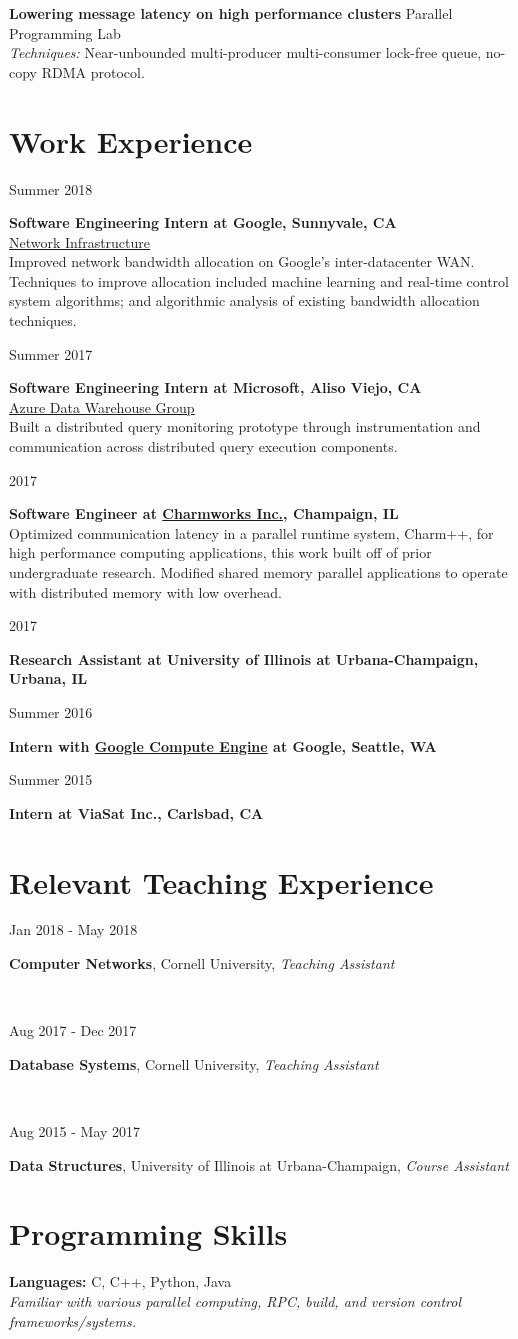 \documentclass[10pt]{article}
\newcommand{\leftrightrow}[2]{
	#1 \hfill #2 \\
}
\newcommand{\teachblock}[2]{
\begin{minipage}[t]{0.20\textwidth}
\vspace*{0.4em}
\begin{flushright}#2\end{flushright}
\end{minipage}
\hfill\vline\hfill
\begin{minipage}[t]{0.76\textwidth}
\vspace*{0.4em}
	#1
\end{minipage}
\vspace{0.2em}
}
\newcommand{\workblock}[4]{
\begin{minipage}[t]{0.14\textwidth}
\vspace*{0.4em}
\begin{flushright}#3\end{flushright}
\end{minipage}
\hfill\vline\hfill
\begin{minipage}[t]{0.82\textwidth}
\vspace*{0.4em}
	\textbf{#1} \\
	#2 \\
    #4
\end{minipage}
\vspace{0.7em}
}
\newcommand{\workblockempty}[2]{
\begin{minipage}[t]{0.14\textwidth}
\vspace*{0.4em}
\begin{flushright}#2\end{flushright}
\end{minipage}
\hfill\vline\hfill
\begin{minipage}[t]{0.82\textwidth}
\vspace*{0.4em}
	\textbf{#1}
\end{minipage}
\vspace{0.1em}
}
\newcommand{\workblocktwo}[3]{
\begin{minipage}[t]{0.14\textwidth}
\vspace*{0.4em}
\begin{flushright}#2\end{flushright}
\end{minipage}
\hfill\vline\hfill
\begin{minipage}[t]{0.82\textwidth}
\vspace*{0.4em}
	\textbf{#1} \\
    #3
\end{minipage}
\vspace{0.7em}
}
\newcommand{\researchblock}[3]{
	\leftrightrow{\textbf{#1}}{#2}#3
}
\begin{document}
\vspace{0.6em}

\researchblock{Lowering message latency on high performance clusters}{Parallel Programming Lab}
{
	\textit{Techniques: } Near-unbounded multi-producer multi-consumer lock-free queue, no-copy RDMA protocol.
}

\section{Work Experience}
\vspace{-0.4em}
\workblock{Software Engineering Intern at Google, Sunnyvale, CA}{\href{https://ai.google/research/pubs/pub43838}{Network Infrastructure}}{Summer 2018}{Improved network bandwidth allocation on Google's inter-datacenter WAN. Techniques to improve allocation included machine learning and real-time control system algorithms; and algorithmic analysis of existing bandwidth allocation techniques.}

\workblock{Software Engineering Intern at Microsoft, Aliso Viejo, CA}{\href{https://azure.microsoft.com/en-us/services/sql-data-warehouse/}{Azure Data Warehouse Group}}{Summer 2017}{Built a distributed query monitoring prototype through instrumentation and communication across distributed query execution components.}

\workblocktwo{Software Engineer at \href{http://www.charmplusplus.com/}{Charmworks Inc.}, Champaign, IL}{2017}{Optimized communication latency in a parallel runtime system, Charm++, for high performance computing applications, this work built off of prior undergraduate research. Modified shared memory parallel applications to operate with distributed memory with low overhead.
}

\workblockempty{Research Assistant at University of Illinois at Urbana-Champaign, Urbana, IL}{2017}

\workblockempty{Intern with \href{https://cloud.google.com/compute/}{Google Compute Engine} at Google, Seattle, WA}{Summer 2016}

\workblockempty{Intern at ViaSat Inc., Carlsbad, CA}{Summer 2015}

\vspace{-0.4em}

\section{Relevant Teaching Experience}
\vspace{-0.8em}
\teachblock{\textbf{Computer Networks}, Cornell University, \textit{Teaching Assistant}}{Jan 2018 - May 2018} \\
\teachblock{\textbf{Database Systems}, Cornell University, \textit{Teaching Assistant}}{Aug 2017 - Dec 2017} \\
\teachblock{\textbf{Data Structures}, University of Illinois at Urbana-Champaign, \textit{Course Assistant}}{Aug 2015 - May 2017}

\vspace{-0.44em}

\section{Programming Skills}
\vspace{0.1em}
\textbf{Languages:} C, C++, Python, Java \\
\textit{Familiar with various parallel computing, RPC, build, and version control frameworks/systems.}
\end{document}

